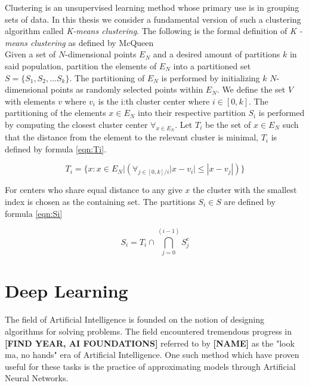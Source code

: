 Clustering is an unsupervised learning method whose primary use is in grouping sets of data. In this thesis we consider a fundamental version of such a clustering algorithm called \textit{K-means clustering}. The following is the formal definition of \textit{K - means clustering} as defined by McQueen
\\
Given a set of $N$-dimensional points $E_N$ and a desired amount of partitions $k$ in said population, partition the elements of $E_N$ into a partitioned set $S = \{S_1, S_2, ... S_k\}$. The partitioning of $E_N$ is performed by initializing $k$  $N$-dimensional points as randomly selected points within $E_N$. We define the set $V$ with elements $v$ where $v_i$ is the i:th cluster center where $i \in [0, k]$. The partitioning of the elements $x \in E_N$ into their respective partition $S_i$ is performed by computing the closest cluster center $\forall_{x \in E_N}$. Let $T_i$ be the set of $x \in E_N$ such that the distance from the element to the relevant cluster is minimal, $T_i$ is defined by formula \ref{eqn:Ti}.

\begin{equation}
\label{eqn:Ti}
T_i = \{x : x \in E_N | (\forall_{j \in [0, k]/i } |x - v_i| \leq |x - v_j|)\} 
\end{equation}

For centers who share equal distance to any give $x$ the cluster with the smallest index is chosen as the containing set. The partitions $S_i \in S$ are defined by formula \ref{eqn:Si}

\begin{equation}
\label{eqn:Si}
S_i = T_i \cap \bigcap_{j=0}^{(i-1)} S_j^c
\end{equation}

\section{Deep Learning}

The field of Artificial Intelligence is founded on the notion of designing algorithms for solving problems. The field encountered tremendous progress in \textbf{[FIND YEAR, AI FOUNDATIONS]} referred to by \textbf{[NAME]} as the "look ma, no hands" era of Artificial Intelligence. One such method which have proven useful for these tasks is the practice of approximating models through Artificial Neural Networks.

